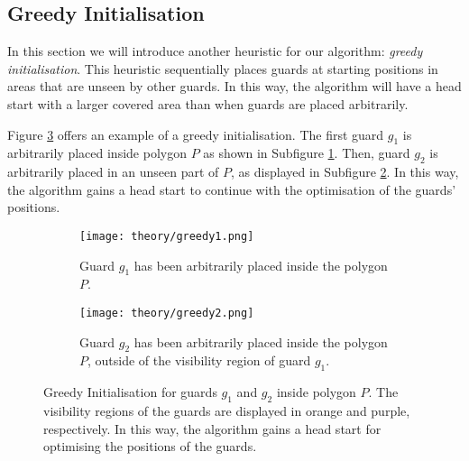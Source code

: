 \subsection{Greedy Initialisation}
\label{sec:greedy}
In this section we will introduce another heuristic for our algorithm: \textit{greedy initialisation}. This heuristic sequentially places guards at starting positions in areas that are unseen by other guards. In this way, the algorithm will have a head start with a larger covered area than when guards are placed arbitrarily.

Figure \ref{fig:greedy} offers an example of a greedy initialisation. The first guard $g_1$ is arbitrarily placed inside polygon $P$ as shown in Subfigure \ref{fig:greedy1}. Then, guard $g_2$ is arbitrarily placed in an unseen part of $P$, as displayed in Subfigure \ref{fig:greedy2}. In this way, the algorithm gains a head start to continue with the optimisation of the guards' positions.

\begin{figure}[h!]
    \centering
    \begin{subfigure}{0.45\textwidth}
        \texttt{[image: theory/greedy1.png]}
        \caption{Guard $g_1$ has been arbitrarily placed inside the polygon $P$.}
        \label{fig:greedy1}
    \end{subfigure}
    \hfill
    \begin{subfigure}{0.45\textwidth}
        \texttt{[image: theory/greedy2.png]}
        \caption{Guard $g_2$ has been arbitrarily placed inside the polygon $P$, outside of the visibility region of guard $g_1$.}
        \label{fig:greedy2}
    \end{subfigure}
    \caption{Greedy Initialisation for guards $g_1$ and $g_2$ inside polygon $P$. The visibility regions of the guards are displayed in orange and purple, respectively. In this way, the algorithm gains a head start for optimising the positions of the guards.}
    \label{fig:greedy}
\end{figure}
